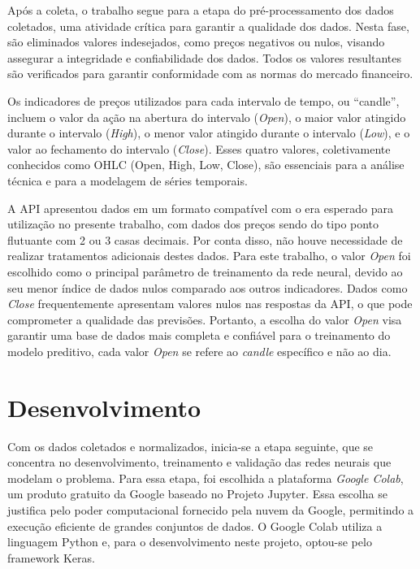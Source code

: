 Após a coleta, o trabalho segue para a etapa do pré-processamento dos dados coletados, uma atividade crítica para garantir a qualidade dos dados. Nesta fase, são eliminados valores indesejados, como preços negativos ou nulos, visando assegurar a integridade e confiabilidade dos dados. Todos os valores resultantes são verificados para garantir conformidade com as normas do mercado financeiro.

Os indicadores de preços utilizados para cada intervalo de tempo, ou “candle”, incluem o valor da ação na abertura do intervalo (\textit{Open}), o maior valor atingido durante o intervalo (\textit{High}), o menor valor atingido durante o intervalo (\textit{Low}), e o valor ao fechamento do intervalo (\textit{Close}). Esses quatro valores, coletivamente conhecidos como OHLC (Open, High, Low, Close), são essenciais para a análise técnica e para a modelagem de séries temporais.

A API apresentou dados em um formato compatível com o era esperado para utilização no presente trabalho, com dados dos preços sendo do tipo ponto flutuante com 2 ou 3 casas decimais. Por conta disso, não houve necessidade de realizar tratamentos adicionais destes dados. Para este trabalho, o valor \textit{Open} foi escolhido como o principal parâmetro de treinamento da rede neural, devido ao seu menor índice de dados nulos comparado aos outros indicadores. Dados como \textit{Close} frequentemente apresentam valores nulos nas respostas da API, o que pode comprometer a qualidade das previsões. Portanto, a escolha do valor \textit{Open} visa garantir uma base de dados mais completa e confiável para o treinamento do modelo preditivo, cada valor \textit{Open} se refere ao \textit{candle} específico e não ao dia.

\section{Desenvolvimento}

Com os dados coletados e normalizados, inicia-se a etapa seguinte, que se concentra no desenvolvimento, treinamento e validação das redes neurais que modelam o problema. Para essa etapa, foi escolhida a plataforma \textit{Google Colab}, um produto gratuito da Google baseado no Projeto Jupyter. Essa escolha se justifica pelo poder computacional fornecido pela nuvem da Google, permitindo a execução eficiente de grandes conjuntos de dados. O Google Colab utiliza a linguagem Python e, para o desenvolvimento neste projeto, optou-se pelo framework Keras.


